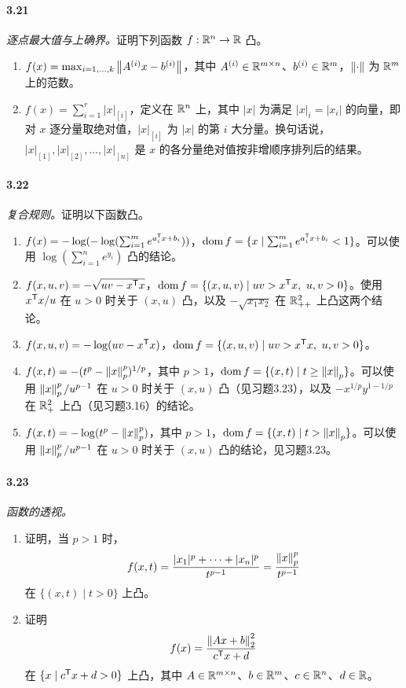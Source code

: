 \paragraph{3.21}\textit{逐点最大值与上确界。}证明下列函数 $f:\mathbb R^n\to\mathbb R$ 凸。
\begin{enumerate}[label=(\alph*)]
\item $f(x)=\max_{i=1,\ldots,k}\left\lVert A^{(i)}x-b^{(i)}\right\rVert$，其中 $A^{(i)}\in\mathbb R^{m\times n}$、$b^{(i)}\in\mathbb R^m$，$\left\lVert \cdot\right\rVert$ 为 $\mathbb R^m$ 上的范数。
\item $f(x)=\sum_{i=1}^r|x|_{[i]}$，定义在 $\mathbb R^n$ 上，其中 $|x|$ 为满足 $|x|_i=|x_i|$ 的向量，即对 $x$ 逐分量取绝对值，$|x|_{[i]}$ 为 $|x|$ 的第 $i$ 大分量。换句话说，$|x|_{[1]},|x|_{[2]},\ldots,|x|_{[n]}$ 是 $x$ 的各分量绝对值按非增顺序排列后的结果。
\end{enumerate}
\paragraph{3.22}\textit{复合规则。}证明以下函数凸。
\begin{enumerate}[label=(\alph*)]
\item $f(x)=-\log(-\log(\sum_{i=1}^m e^{a_i^\mathsf T x+b_i}))$，$\operatorname{dom} f=\{x\mid\sum_{i=1}^m e^{a_i^\mathsf T x+b_i}<1\}$。可以使用 $\log(\sum_{i=1}^n e^{y_i})$ 凸的结论。
\item $f(x,u,v)=-\sqrt{uv-x^\mathsf T x}$，$\operatorname{dom} f=\{(x,u,v)\mid uv>x^\mathsf T x,\ u,v>0\}$。使用 $x^\mathsf T x/u$ 在 $u>0$ 时关于 $(x,u)$ 凸，以及 $-\sqrt{x_1x_2}$ 在 $\mathbb R_{++}^2$ 上凸这两个结论。
\item $f(x,u,v)=-\log(uv-x^\mathsf T x)$，$\operatorname{dom} f=\{(x,u,v)\mid uv>x^\mathsf T x,\ u,v>0\}$。
\item $f(x,t)=-(t^p-\left\lVert x\right\rVert_p^p)^{1/p}$，其中 $p>1$，$\operatorname{dom} f=\{(x,t)\mid t\geq\left\lVert x\right\rVert_p\}$。可以使用 $\left\lVert x\right\rVert_p^p/u^{p-1}$ 在 $u>0$ 时关于 $(x,u)$ 凸（见习题3.23），以及 $-x^{1/p}y^{1-1/p}$ 在 $\mathbb R_+^2$ 上凸（见习题3.16）的结论。
\item $f(x,t)=-\log(t^p-\left\lVert x\right\rVert_p^p)$，其中 $p>1$，$\operatorname{dom} f=\{(x,t)\mid t>\left\lVert x\right\rVert_p\}$。可以使用 $\left\lVert x\right\rVert_p^p/u^{p-1}$ 在 $u>0$ 时关于 $(x,u)$ 凸的结论，见习题3.23。
\end{enumerate}
\paragraph{3.23}\textit{函数的透视。}
\begin{enumerate}[label=(\alph*)]
\item 证明，当 $p>1$ 时，
\[f(x,t)=\frac{|x_1|^p+\cdots+|x_n|^p}{t^{p-1}}=\frac{\left\lVert x\right\rVert_p^p}{t^{p-1}}\]
在 $\{(x,t)\mid t>0\}$ 上凸。
\item 证明
\[f(x)=\frac{\left\lVert Ax+b\right\rVert_2^2}{c^\mathsf T x+d}\]
在 $\{x\mid c^\mathsf T x+d>0\}$ 上凸，其中 $A\in\mathbb R^{m\times n}$、$b\in\mathbb R^m$、$c\in\mathbb R^n$、$d\in\mathbb R$。
\end{enumerate}
